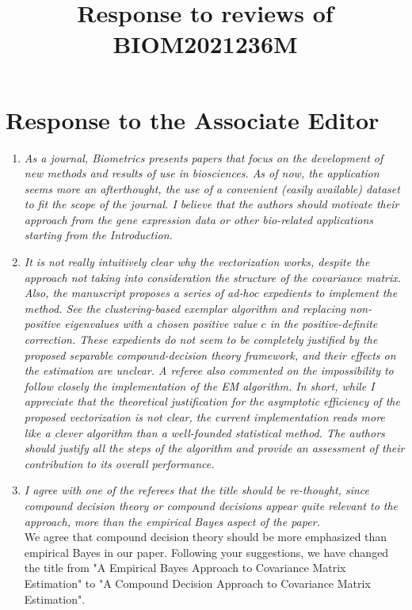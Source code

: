 \documentclass[12pt]{article}
\title{Response to reviews of BIOM2021236M}
\author{}
\date{}
\begin{document}
\maketitle

\section{Response to the Associate Editor}

\begin{enumerate}
\item \emph{As a journal, Biometrics presents papers that focus on the development of new methods and results of use in biosciences. As of now, the application seems more an afterthought, the use of a convenient (easily available) dataset to fit the scope of the journal. I believe that the authors should motivate their approach from the gene expression data or other bio-related applications starting from the Introduction.}
\item \emph{It is not really intuitively clear why the vectorization works, despite the approach not taking into consideration the structure of the covariance matrix. Also, the manuscript proposes a series of ad-hoc expedients to implement the method. See the clustering-based exemplar algorithm and replacing non-positive eigenvalues with a chosen positive value $c$ in the positive-definite correction. These expedients do not seem to be completely justified by the proposed separable compound-decision theory framework, and their effects on the estimation are unclear. A referee also commented on the impossibility to follow closely the implementation of the EM algorithm. In short, while I appreciate that the theoretical justification for the asymptotic efficiency of the proposed vectorization is not clear, the current implementation reads more like a clever algorithm than a well-founded statistical method. The authors should justify all the steps of the algorithm and provide an assessment of their contribution to its overall performance.}

\item \emph{I agree with one of the referees that the title should be re-thought, since compound decision theory or compound decisions appear quite relevant to the approach, more than the empirical Bayes aspect of the paper.}\\
We agree that compound decision theory should be more emphasized than empirical Bayes in our paper. Following your suggestions, we have changed the title from "A Empirical Bayes Approach to Covariance Matrix Estimation" to "A Compound Decision Approach to Covariance Matrix Estimation".


\end{enumerate}
\end{document}
